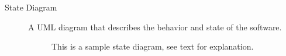 \begin{description}
\item[State Diagram] A UML diagram that describes the behavior and state
of the software.
\begin{figure}[h!]
\caption[State Diagram Example]{
This is a sample state diagram, see text for explanation.}
\end{figure}

\end{description}

%
%
